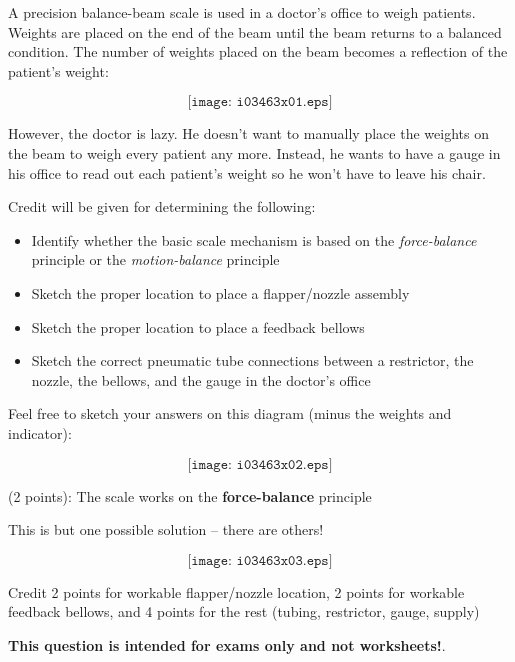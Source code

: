 

A precision balance-beam scale is used in a doctor's office to weigh patients.  Weights are placed on the end of the beam until the beam returns to a balanced condition.  The number of weights placed on the beam becomes a reflection of the patient's weight:

$$\texttt{[image: i03463x01.eps]}$$

However, the doctor is lazy.  He doesn't want to manually place the weights on the beam to weigh every patient any more.  Instead, he wants to have a gauge in his office to read out each patient's weight so he won't have to leave his chair.

\vskip 10pt

\noindent
Credit will be given for determining the following:

\begin{itemize}
\item{} Identify whether the basic scale mechanism is based on the {\it force-balance} principle or the {\it motion-balance} principle
\item{} Sketch the proper location to place a flapper/nozzle assembly
\item{} Sketch the proper location to place a feedback bellows
\item{} Sketch the correct pneumatic tube connections between a restrictor, the nozzle, the bellows, and the gauge in the doctor's office
\end{itemize}

Feel free to sketch your answers on this diagram (minus the weights and indicator):

\vskip 40pt

$$\texttt{[image: i03463x02.eps]}$$







(2 points): The scale works on the {\bf force-balance} principle

\vskip 10pt

This is but one possible solution -- there are others!

$$\texttt{[image: i03463x03.eps]}$$

Credit 2 points for workable flapper/nozzle location, 2 points for workable feedback bellows, and 4 points for the rest (tubing, restrictor, gauge, supply)







{\bf This question is intended for exams only and not worksheets!}.



